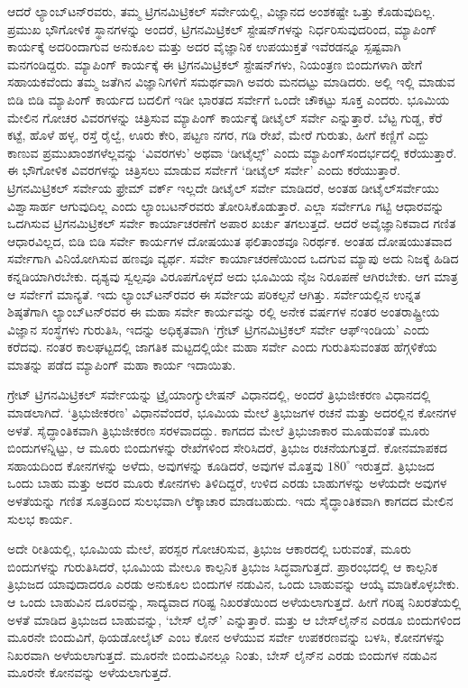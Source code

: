 ಆದರೆ ಲ್ಯಾಂಬ್​ಟನ್​ರವರು, ತಮ್ಮ ಟ್ರಿಗನಮಿಟ್ರಿಕಲ್​ ಸರ್ವೇಯಲ್ಲಿ, ವಿಜ್ಞಾನದ ಅಂಶಕಷ್ಟೇ ಒತ್ತು ಕೊಡುವುದಿಲ್ಲ. ಪ್ರಮುಖ ಭೌಗೋಳಿಕ ಸ್ಥಾನಗಳನ್ನು ಅಂದರೆ, ಟ್ರಿಗನಮಿಟ್ರಿಕಲ್​ ಸ್ಟೇಷನ್​ಗಳನ್ನು ನಿರ್ಧರಿಸುವುದರಿಂದ, ಮ್ಯಾಪಿಂಗ್​ ಕಾರ್ಯಕ್ಕೆ ಅದರಿಂದಾಗುವ ಅನುಕೂಲ ಮತ್ತು ಅದರ ವೈಜ್ಞಾನಿಕ ಉಪಯುಕ್ತತೆ ಇವೆರಡನ್ನೂ ಸ್ಪಷ್ಟವಾಗಿ ಮನಗಂಡಿದ್ದರು. ಮ್ಯಾಪಿಂಗ್​ ಕಾರ್ಯಕ್ಕೆ ಈ ಟ್ರಿಗನಮಿಟ್ರಿಕಲ್​ ಸ್ಟೇಷನ್​ಗಳು, ನಿಯಂತ್ರಣ ಬಿಂದುಗಳಾಗಿ ಹೇಗೆ ಸಹಾಯಕವೆಂದು ತಮ್ಮ ಜತೆಗಿನ ವಿಜ್ಞಾನಿಗಳಿಗೆ ಸಮರ್ಥವಾಗಿ ಅವರು ಮನದಟ್ಟು ಮಾಡಿದರು. ಅಲ್ಲಿ ಇಲ್ಲಿ ಮಾಡುವ ಬಿಡಿ ಬಿಡಿ ಮ್ಯಾಪಿಂಗ್​ ಕಾರ್ಯದ ಬದಲಿಗೆ ಇಡೀ ಭಾರತದ ಸರ್ವೇಗೆ ಒಂದೇ ಚೌಕಟ್ಟು ಸೂಕ್ತ ಎಂದರು. ಭೂಮಿಯ ಮೇಲಿನ ಗೋಚರ ವಿವರಗಳನ್ನು ಚಿತ್ರಿಸುವ ಮ್ಯಾಪಿಂಗ್​ ಕಾರ್ಯಕ್ಕೆ ಡೀಟೈಲ್​ ಸರ್ವೇ ಎನ್ನುತ್ತಾರೆ. ಬೆಟ್ಟ ಗುಡ್ಡ, ಕೆರೆ ಕಟ್ಟೆ, ಹೊಳೆ ಹಳ್ಳ, ರಸ್ತೆ ರೈಲ್ವೆ, ಊರು ಕೇರಿ, ಪಟ್ಟಣ ನಗರ, ಗಡಿ ರೇಖೆ, ಮೇರೆ ಗುರುತು, ಹೀಗೆ ಕಣ್ಣಿಗೆ ಎದ್ದು ಕಾಣುವ ಪ್ರಮುಖಾಂಶಗಳೆಲ್ಲವನ್ನು ‘ವಿವರಗಳು’ ಅಥವಾ ‘ಡೀಟೈಲ್ಸ್’ ಎಂದು ಮ್ಯಾಪಿಂಗ್​ ಸಂದರ್ಭದಲ್ಲಿ ಕರೆಯುತ್ತಾರೆ. ಈ ಭೌಗೋಳಿಕ ವಿವರಗಳನ್ನು ಚಿತ್ರಿಸಲು ಮಾಡುವ ಸರ್ವೇಗೆ ‘ಡೀಟೈಲ್​ ಸರ್ವೇ’ ಎಂದು ಕರೆಯುತ್ತಾರೆ. ಟ್ರಿಗನಮಿಟ್ರಿಕಲ್​ ಸರ್ವೇಯ ಫ್ರೇಮ್ ವರ್ಕ್ ಇಲ್ಲದೇ ಡೀಟೈಲ್​ ಸರ್ವೇ ಮಾಡಿದರೆ, ಅಂತಹ ಡೀಟೈಲ್​ ಸರ್ವೇಯು ವಿಶ್ವಾಸಾರ್ಹ ಆಗುವುದಿಲ್ಲ ಎಂದು ಲ್ಯಾಂಬಟನ್​ರವರು ತೋರಿಸಿಕೊಡುತ್ತಾರೆ. ಎಲ್ಲಾ ಸರ್ವೇಗೂ ಗಟ್ಟಿ ಆಧಾರವನ್ನು ಒದಗಿಸುವ ಟ್ರಿಗನಮಿಟ್ರಿಕಲ್​ ಸರ್ವೇ ಕಾರ್ಯಾಚರಣೆಗೆ ಅಪಾರ ಖರ್ಚು ತಗಲುತ್ತದೆ. ಆದರೆ ಅವೈಜ್ಞಾನಿಕವಾದ ಗಣಿತ ಆಧಾರವಿಲ್ಲದ, ಬಿಡಿ ಬಿಡಿ ಸರ್ವೇ ಕಾರ್ಯಗಳ ದೋಷಯುತ ಫಲಿತಾಂಶವೂ ನಿರರ್ಥಕ. ಅಂತಹ ದೋಷಯುತವಾದ ಸರ್ವೇಗಾಗಿ ವಿನಿಯೋಗಿಸುವ ಹಣವೂ ವ್ಯರ್ಥ. ಸರ್ವೇ ಕಾರ್ಯಾಚರಣೆಯಿಂದ ಒದಗುವ ಮ್ಯಾಪು ಅದು ನಿಜಕ್ಕೆ ಹಿಡಿದ ಕನ್ನಡಿಯಾಗಿರಬೇಕು. ದೃಶ್ಯವು ಸ್ವಲ್ಪವೂ ವಿರೂಪಗೊಳ್ಳದೆ ಅದು ಭೂಮಿಯ ನೈಜ ನಿರೂಪಣೆ ಆಗಿರಬೇಕು. ಆಗ ಮಾತ್ರ ಆ ಸರ್ವೇಗೆ ಮಾನ್ಯತೆ. ಇದು ಲ್ಯಾಂಬ್​ಟನ್​ರವರ ಈ ಸರ್ವೇಯ ಪರಿಕಲ್ಪನೆ ಆಗಿತ್ತು. ಸರ್ವೇಯಲ್ಲಿನ ಉನ್ನತ ಶಿಷ್ಠತೆಗಾಗಿ ಲ್ಯಾಂಬ್​ಟನ್​ರವರ ಈ ಮಹಾ ಸರ್ವೇ ಕಾರ್ಯವನ್ನು ರಲ್ಲಿ ಅನೇಕ ವರ್ಷಗಳ ನಂತರ ಅಂತರಾಷ್ಟ್ರೀಯ ವಿಜ್ಞಾನ ಸಂಸ್ಥೆಗಳು ಗುರುತಿಸಿ, ಇದನ್ನು ಅಧಿಕೃತವಾಗಿ ‘ಗ್ರೇಟ್​ ಟ್ರಿಗನಮಿಟ್ರಿಕಲ್​ ಸರ್ವೇ ಆಫ್​ ಇಂಡಿಯ’ ಎಂದು ಕರೆದವು. ನಂತರ ಕಾಲಘಟ್ಟದಲ್ಲಿ ಜಾಗತಿಕ ಮಟ್ಟದಲ್ಲಿಯೇ ಮಹಾ ಸರ್ವೇ ಎಂದು ಗುರುತಿಸುವಂತಹ ಹೆಗ್ಗಳಿಕೆಯ ಮಾತನ್ನು ಪಡೆದ ಮ್ಯಾಪಿಂಗ್​ ಮಹಾ ಕಾರ್ಯ ಇದಾಯಿತು.

ಗ್ರೇಟ್​ ಟ್ರಿಗನಮಿಟ್ರಿಕಲ್​ ಸರ್ವೇಯನ್ನು ಟ್ರೈಯಾಂಗ್ಯುಲೇಷನ್​ ವಿಧಾನದಲ್ಲಿ, ಅಂದರೆ ತ್ರಿಭುಜೀಕರಣ ವಿಧಾನದಲ್ಲಿ ಮಾಡಲಾಗಿದೆ. ‘ತ್ರಿಭುಜೀಕರಣ’ ವಿಧಾನವೆಂದರೆ, ಭೂಮಿಯ ಮೇಲೆ ತ್ರಿಭುಜಗಳ ರಚನೆ ಮತ್ತು ಅದರಲ್ಲಿನ ಕೋನಗಳ ಅಳತೆ. ಸೈದ್ಧಾಂತಿಕವಾಗಿ ತ್ರಿಭುಜೀಕರಣ ಸರಳವಾದದ್ದು. ಕಾಗದದ ಮೇಲೆ ತ್ರಿಭುಜಾಕಾರ ಮೂಡುವಂತೆ ಮೂರು ಬಿಂದುಗಳನ್ನಿಟ್ಟು, ಆ ಮೂರು ಬಿಂದುಗಳನ್ನು ರೇಖೆಗಳಿಂದ ಸೇರಿಸಿದರೆ, ತ್ರಿಭುಜ ರಚನೆಯಗುತ್ತದೆ. ಕೋನಮಾಪಕದ ಸಹಾಯದಿಂದ ಕೋನಗಳನ್ನು ಅಳೆದು, ಅವುಗಳನ್ನು ಕೂಡಿದರೆ, ಅವುಗಳ ಮೊತ್ತವು $180^\circ$ ಇರುತ್ತದೆ. ತ್ರಿಭುಜದ ಒಂದು ಬಾಹು ಮತ್ತು ಅದರ ಮೂರು ಕೋನಗಳು ತಿಳಿದಿದ್ದರೆ, ಉಳಿದ ಎರಡು ಬಾಹುಗಳನ್ನು ಅಳೆಯದೇ ಅವುಗಳ ಅಳತೆಯನ್ನು ಗಣಿತ ಸೂತ್ರದಿಂದ ಸುಲಭವಾಗಿ ಲೆಕ್ಕಾಚಾರ ಮಾಡಬಹುದು. ಇದು ಸೈದ್ಧಾಂತಿಕವಾಗಿ ಕಾಗದದ ಮೇಲಿನ ಸುಲಭ ಕಾರ್ಯ.

ಅದೇ ರೀತಿಯಲ್ಲಿ, ಭೂಮಿಯ ಮೇಲೆ, ಪರಸ್ಪರ ಗೋಚರಿಸುವ, ತ್ರಿಭುಜ ಆಕಾರದಲ್ಲಿ ಬರುವಂತೆ, ಮೂರು ಬಿಂದುಗಳನ್ನು ಗುರುತಿಸಿದರೆ, ಭೂಮಿಯ ಮೇಲೂ ಕಾಲ್ಪನಿಕ ತ್ರಿಭುಜ ಸಿದ್ಧವಾಗುತ್ತದೆ. ಪ್ರಾರಂಭದಲ್ಲಿ ಆ ಕಾಲ್ಪನಿಕ ತ್ರಿಭುಜದ ಯಾವುದಾದರೂ ಎರಡು ಅನುಕೂಲ ಬಿಂದುಗಳ ನಡುವಿನ, ಒಂದು ಬಾಹುವನ್ನು ಆಯ್ಕೆ ಮಾಡಿಕೊಳ್ಳಬೇಕು. ಆ ಒಂದು ಬಾಹುವಿನ ದೂರವನ್ನು, ಸಾದ್ಯವಾದ ಗರಿಷ್ಟ ನಿಖರತೆಯಿಂದ ಅಳೆಯಲಾಗುತ್ತದೆ. ಹೀಗೆ ಗರಿಷ್ಠ ನಿಖರತೆಯಲ್ಲಿ ಅಳತೆ ಮಾಡಿದ ತ್ರಿಭುಜದ ಬಾಹುವನ್ನು, ‘ಬೇಸ್​ ಲೈನ್​’ ಎನ್ನುತ್ತಾರೆ. ಮತ್ತು ಆ ಬೇಸ್​ ಲೈನ್​ನ ಎರಡೂ ಬಿಂದುಗಳಿಂದ ಮೂರನೇ ಬಿಂದುವಿಗೆ, ಥಿಯಡೋಲೈಟ್​ ಎಂಬ ಕೋನ ಅಳೆಯುವ ಸರ್ವೇ ಉಪಕರಣವನ್ನು ಬಳಸಿ, ಕೋನಗಳನ್ನು ನಿಖರವಾಗಿ ಅಳೆಯಲಾಗುತ್ತದೆ. ಮೂರನೇ ಬಿಂದುವಿನಲ್ಲೂ ನಿಂತು, ಬೇಸ್​ ಲೈನ್​ನ ಎರಡು ಬಿಂದುಗಳ ನಡುವಿನ ಮೂರನೇ ಕೋನವನ್ನು ಅಳೆಯಲಾಗುತ್ತದೆ.

